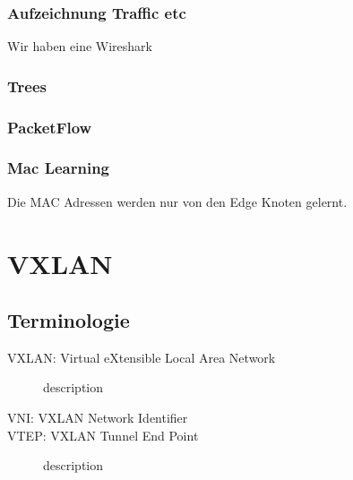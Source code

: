 \subsubsection{Aufzeichnung Traffic etc}

Wir haben eine Wireshark


\subsubsection{Trees}



\subsubsection{PacketFlow}


\subsubsection{Mac Learning}
Die MAC Adressen werden nur von den Edge Knoten gelernt. 


\section{VXLAN}
\subsection{Terminologie}
\begin{description}
	\item[VXLAN: Virtual eXtensible Local Area Network] description
	\item[VNI: VXLAN Network Identifier] 
	\item[VTEP: VXLAN Tunnel End Point] description 

\end{description}

